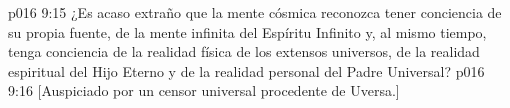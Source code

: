 \vs p016 9:15 ¿Es acaso extraño que la mente cósmica reconozca tener conciencia de su propia fuente, de la mente infinita del Espíritu Infinito y, al mismo tiempo, tenga conciencia de la realidad física de los extensos universos, de la realidad espiritual del Hijo Eterno y de la realidad personal del Padre Universal?
\vsetoff
\vs p016 9:16 [Auspiciado por un censor universal procedente de Uversa.]
